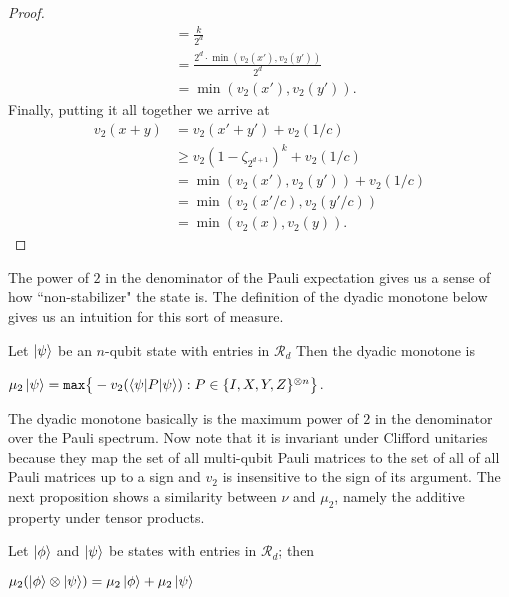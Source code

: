 \documentclass[12pt]{dalthesis}
\begin{document}
\begin{proof}
\begin{equation*}
\begin{split}
& = \frac{k}{2^d} \\
& = \frac{2^d \cdot \min (v_2(x'), v_2 (y'))}{2^d} \\
& = \min (v_2(x'), v_2 (y')).
\end{split}
\end{equation*}
Finally, putting it all together we arrive at
\begin{equation*}
\begin{split}
v_2 (x + y) & = v_2(x' + y') + v_2(1/c) \\
& \geq v_2(1-\zeta_{2^{d+1}})^k + v_2(1/c) \\
& = \min (v_2(x'), v_2 (y')) + v_2 (1/c) \\
& = \min (v_2(x'/c), v_2 (y'/c)) \\
& = \min (v_2(x), v_2 (y)).
\end{split}
\end{equation*}
\end{proof}

The power of $2$ in the denominator of the Pauli expectation gives us a sense of how ``non-stabilizer" the state is. The definition of the dyadic monotone below gives us an intuition for this sort of measure. 

\begin{definition}
Let $\ket{\psi}$ be an $n$-qubit state with entries in $\mathcal{R}_d$ Then the dyadic monotone is 
\begin{center}
$\mu_2 \ket{\psi} = \texttt{max} \big\{-v_2(\braket{\psi | P | \psi}): P \in \{I, X, Y, Z \}^{\otimes n} \big\}$.
\end{center}
\end{definition}
The dyadic monotone basically is the maximum power of $2$ in the denominator over the Pauli spectrum. Now note that it is invariant under Clifford unitaries because they map the set of all multi-qubit Pauli matrices to the set of all of all Pauli matrices up to a sign and $v_2$ is insensitive to the sign of its argument. The next proposition shows a similarity between $\nu$ and $\mu_2$, namely the additive property under tensor products.

\begin{proposition}
Let $\ket{\phi}$ and $\ket{\psi}$ be states with entries in $\mathcal{R}_d$; then 
\begin{center}
$\mu_2 (\ket{\phi} \otimes \ket{\psi}) = \mu_2 \ket{\phi} + \mu_2 \ket{\psi}$
\end{center}
\end{proposition}
\end{document}
